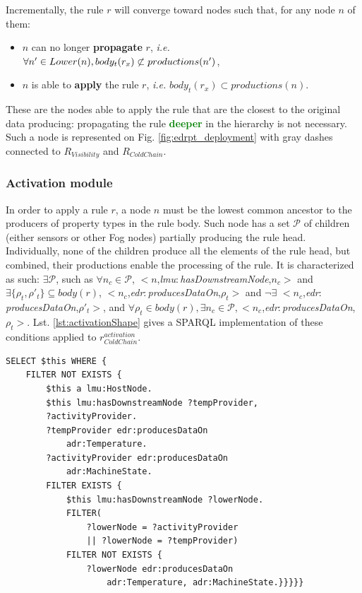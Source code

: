 \documentclass{iosart2c}
\newcommand{\added}[1]{\textcolor{green}{\textbf{#1}}}
\newcommand{\namespace}[1]{\textit{#1$:$}}
\newcommand{\concept}[2]{\namespace{#1}\-\textit{#2}}
\newcommand{\triplet}[3]{$<$#1,\textit{#2},#3$>$}
\begin{document}
Incrementally, the rule $r$ will converge toward nodes such that, for any node $n$ of them:
\begin{itemize}
	\item $n$ can no longer \textbf{propagate} $r$, \textit{i.e.} $\forall n'\in Lo\-wer(n), body_t(r_{x})\not\subset pro\-du\-ctions(n')$,
	\item $n$ is able to \textbf{apply} the rule $r$, \textit{i.e.} $body_t(r_{x})\subset productions(n)$.
\end{itemize} 
These are the nodes able to apply the rule that are the closest to the original data producing: propagating the rule \added{deeper} in the hierarchy is not necessary.
Such a node is represented on Fig. \ref{fig:edrpt_deployment} with gray dashes connected to $R_{Visibility}$ and $R_{ColdChain}$. 

\subsubsection{Activation module}

In order to apply a rule $r$, a node $n$ must be the lowest common ancestor to the producers of property types in the rule body. 
Such node has a set $\mathcal{P}$ of children (either sensors or other Fog nodes) partially producing the rule head. 
Individually, none of the children produce all the elements of the rule head, but combined, their productions enable the processing of the rule. 
It is characterized as such: $\exists \mathcal{P}$, such as $\forall n_c\in \mathcal{P}$, \triplet{$n$}{\concept{lmu}{has\-Down\-stream\-Node}}{$n_c$} and $\exists \{\rho_t, \rho'_t\} \subseteq body(r)$, \triplet{$n_c$}{\concept{edr}{produces\-Data\-On}}{$\rho_t$} and $\neg\exists$ \triplet{$n_c$}{\concept{edr}{produces\-Data\-On}}{$\rho'_t$}, and $\forall \rho_t \in body(r), \exists n_c\in \mathcal{P},$\triplet{$n_c$}{\concept{edr}{produces\-Data\-On}}{$\rho_t$}.
Lst. \ref{lst:activationShape} gives a SPARQL implementation of these conditions applied to $r_{ColdChain}^{activation}$. 

\begin{lstlisting}[float, caption=$r_{ColdChain}^{activation}$ shape, label=lst:activationShape]
SELECT $this WHERE {
	FILTER NOT EXISTS {
		$this a lmu:HostNode.
		$this lmu:hasDownstreamNode ?tempProvider,
		?activityProvider.
		?tempProvider edr:producesDataOn 
			adr:Temperature.
		?activityProvider edr:producesDataOn 
			adr:MachineState.
		FILTER EXISTS {
			$this lmu:hasDownstreamNode ?lowerNode.
			FILTER(
				?lowerNode = ?activityProvider 
				|| ?lowerNode = ?tempProvider)
			FILTER NOT EXISTS {
				?lowerNode edr:producesDataOn 
					adr:Temperature, adr:MachineState.}}}}}
\end{lstlisting}
\end{document}
